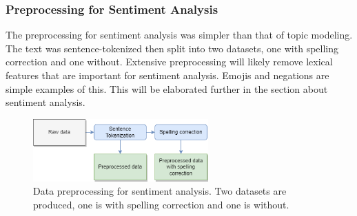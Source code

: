 \subsubsection*{Preprocessing for Sentiment Analysis}

The preprocessing for sentiment analysis was simpler than that of topic modeling. The text was sentence-tokenized then split into two datasets, one with spelling correction and one without. Extensive preprocessing will likely remove lexical features that are important for sentiment analysis. Emojis and negations are simple examples of this. This will be elaborated further in the section about sentiment analysis.

\begin{figure}[h]
    \centering
    \includegraphics[width=0.6\textwidth]{resources/preprocessing_sentiment_analysis.png}
    \caption{Data preprocessing for sentiment analysis. Two datasets are produced, one is with spelling correction and one is without.}
    \label{fig:preprocessing_sentiment_analysis}
\end{figure}